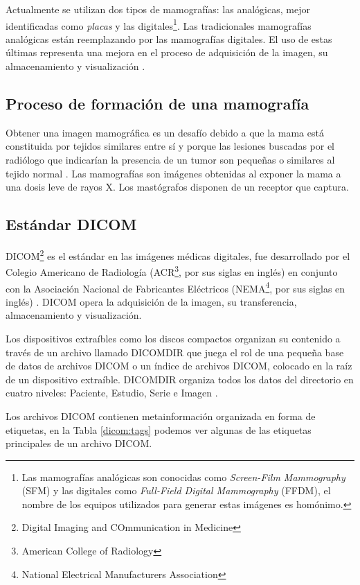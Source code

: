 Actualmente se utilizan dos tipos de mamografías: las analógicas, mejor
identificadas como \textit{placas} y las digitales\footnote{Las mamografías
analógicas son conocidas como \textit{Screen-Film Mammography} (SFM) y las
digitales como \textit{Full-Field Digital Mammography} (FFDM), el nombre de los
equipos utilizados para generar estas imágenes es homónimo.}. Las tradicionales
mamografías analógicas están reemplazando por las mamografías digitales. El uso
de estas últimas representa una mejora en el proceso de adquisición de la
imagen, su almacenamiento y visualización \cite{pisano2000current}. 

\subsection{Proceso de formación de una mamografía}

Obtener una imagen mamográfica es un desafío debido a que la mama está
constituida por tejidos similares entre sí y porque las lesiones buscadas por
el radiólogo que indicarían la presencia de un tumor son pequeñas o similares
al tejido normal \cite{mxcancer}. Las mamografías son imágenes obtenidas al
exponer la mama a una dosis leve de rayos X. Los mastógrafos disponen de un
receptor que captura.

\subsection{Estándar DICOM}

DICOM\footnote{Digital Imaging and COmmunication in Medicine} es el estándar en
las imágenes médicas digitales, fue desarrollado por el Colegio Americano de
Radiología (ACR\footnote{American College of Radiology}, por sus siglas en
inglés) en conjunto con la Asociación Nacional de Fabricantes Eléctricos
(NEMA\footnote{National Electrical Manufacturers Association}, por sus siglas
en inglés) \cite{national1996digital}. DICOM opera la adquisición de la imagen,
su transferencia, almacenamiento y visualización. 

Los dispositivos extraíbles como los discos compactos organizan su contenido a
través de un archivo llamado DICOMDIR que juega el rol de una pequeña base de
datos de archivos DICOM o un índice de archivos DICOM, colocado en la raíz de
un dispositivo extraíble. DICOMDIR organiza todos los datos del directorio en 
cuatro niveles: Paciente, Estudio, Serie e Imagen \cite{pianykh2011digital}.  

Los archivos DICOM contienen metainformación organizada en forma de etiquetas,
en la Tabla \ref{dicom:tags} podemos ver algunas de las etiquetas principales
de un archivo DICOM. 


